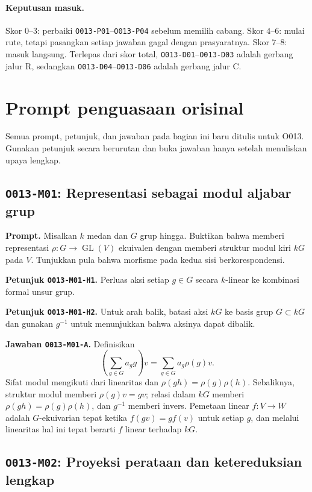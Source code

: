 \documentclass[11pt,a4paper]{article}
\newcommand{\oid}[1]{\texttt{#1}}
\begin{document}
\paragraph{Keputusan masuk.}
Skor $0$--$3$: perbaiki \oid{O013-P01}--\oid{O013-P04} sebelum memilih
cabang. Skor $4$--$6$: mulai rute, tetapi pasangkan setiap jawaban gagal dengan
prasyaratnya. Skor $7$--$8$: masuk langsung. Terlepas dari skor total,
\oid{O013-D01}--\oid{O013-D03} adalah gerbang jalur R, sedangkan
\oid{O013-D04}--\oid{O013-D06} adalah gerbang jalur C.

\section{Prompt penguasaan orisinal}

Semua prompt, petunjuk, dan jawaban pada bagian ini baru ditulis untuk O013.
Gunakan petunjuk secara berurutan dan buka jawaban hanya setelah menuliskan
upaya lengkap.

\subsection*{\oid{O013-M01}: Representasi sebagai modul aljabar grup}

\textbf{Prompt.} Misalkan $k$ medan dan $G$ grup hingga. Buktikan bahwa memberi
representasi $\rho:G\to\operatorname{GL}(V)$ ekuivalen dengan memberi struktur
modul kiri $kG$ pada $V$. Tunjukkan pula bahwa morfisme pada kedua sisi
berkorespondensi.

\textbf{Petunjuk \oid{O013-M01-H1}.} Perluas aksi setiap $g\in G$ secara
$k$-linear ke kombinasi formal unsur grup.

\textbf{Petunjuk \oid{O013-M01-H2}.} Untuk arah balik, batasi aksi $kG$ ke
basis grup $G\subset kG$ dan gunakan $g^{-1}$ untuk menunjukkan bahwa aksinya
dapat dibalik.

\textbf{Jawaban \oid{O013-M01-A}.} Definisikan
\[
\left(\sum_{g\in G}a_gg\right)v=\sum_{g\in G}a_g\rho(g)v.
\]
Sifat modul mengikuti dari linearitas dan $\rho(gh)=\rho(g)\rho(h)$.
Sebaliknya, struktur modul memberi $\rho(g)v=gv$; relasi dalam $kG$ memberi
$\rho(gh)=\rho(g)\rho(h)$, dan $g^{-1}$ memberi invers. Pemetaan linear
$f:V\to W$ adalah $G$-ekuivarian tepat ketika $f(gv)=gf(v)$ untuk setiap
$g$, dan melalui linearitas hal ini tepat berarti $f$ linear terhadap $kG$.

\subsection*{\oid{O013-M02}: Proyeksi perataan dan ketereduksian lengkap}
\end{document}
